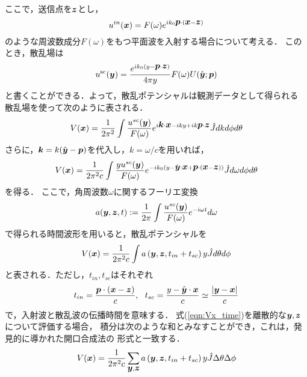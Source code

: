 ここで，送信点を$\mbox{\boldmath $z$}$とし，
\begin{equation}
	u^{in}(\mbox{\boldmath $x$})= F(\omega) e^{ik_0\mbox{\boldmath $p$}\cdot(\mbox{\boldmath $x$}-\mbox{\boldmath $z$})}
	\label{eqn:}
\end{equation}
のような周波数成分$F(\omega)$をもつ平面波を入射する場合について考える．
このとき，散乱場は
\begin{equation}
	u^{\rm sc}(\mbox{\boldmath $y$})= \frac{e^{ik_0(y-\mbox{\boldmath $p$}\cdot \mbox{\boldmath $z$})}}{4\pi y }F(\omega)U(\hat{\mbox{\boldmath $y$}};\mbox{\boldmath $p$}) 
	\label{eqn:}
\end{equation}
と書くことができる．よって，散乱ポテンシャルは観測データとして得られる
散乱場を使って次のように表される．
\begin{equation}
	V(\mbox{\boldmath $x$}) =\frac{1}{2\pi^2} \int \frac{u^{sc}(\mbox{\boldmath $y$})}{F(\omega)}
	e^{i\mbox{\boldmath $k$}\cdot \mbox{\boldmath $x$}-iky+ik\mbox{\boldmath $p$}\cdot\mbox{\boldmath $z$}}
	\hat{J} dkd\phi d\theta	
	\label{eqn:}
\end{equation}
さらに，$\mbox{\boldmath $k$}=k(\hat{\mbox{\boldmath $y$}}-\mbox{\boldmath $p$})$を代入し，$k=\omega/c$を用いれば，
\begin{equation}
	V(\mbox{\boldmath $x$}) =\frac{1}{2\pi^2c} \int \frac{yu^{sc}(\mbox{\boldmath $y$})}{F(\omega)}
	e^{-ik_0(y-\hat{\mbox{\boldmath $y$}}\cdot\mbox{\boldmath $x$}+\mbox{\boldmath $p$}\cdot(\mbox{\boldmath $x$}-\mbox{\boldmath $z$})) }
	\hat{J} d\omega d\phi d\theta	
	\label{eqn:}
\end{equation}
を得る．
ここで，角周波数$\omega$に関するフーリエ変換
\begin{equation}
	a(\mbox{\boldmath $y$},\mbox{\boldmath $z$},t):=\frac{1}{2\pi} \int \frac{u^{sc}(\mbox{\boldmath $y$})}{F(\omega)}e^{-i\omega t}d\omega
	\label{eqn:}
\end{equation}
で得られる時間波形を用いると，散乱ポテンシャルを
\begin{equation}
	V(\mbox{\boldmath $x$}) =\frac{1}{2\pi^2c} \int a\left(\mbox{\boldmath $y$}, \mbox{\boldmath $z$}, t_{in}+t_{sc} \right) y \hat{J} d\theta d\phi
	\label{eqn:Vx_time}
\end{equation}
と表される．ただし，$t_{in},t_{sc}$はそれぞれ
\begin{equation}
	t_{in}=\frac{\fat{p}\cdot \left( \fat{x}-\fat{z}\right)}{c}, \ \ 
	t_{sc}=
	\frac{ y-\hat{\fat{y}}\cdot \fat{x} }{c} \simeq 
	\frac{\left|\fat{y}-\fat{x}\right|}{c} 
	\label{eqn:}
\end{equation}
で，入射波と散乱波の伝播時間を意味する．
式(\ref{eqn:Vx_time})を離散的な$\mbox{\boldmath $y$},\mbox{\boldmath $z$}$について評価する場合，
積分は次のような和とみなすことができ，これは，発見的に導かれた開口合成法の
形式と一致する．
\begin{equation}
	V(\mbox{\boldmath $x$}) = 
	\frac{1}{2\pi^2c} 
	\sum_{\mbox{\boldmath $y$},\mbox{\boldmath $z$}} 
	a\left(\mbox{\boldmath $y$}, \mbox{\boldmath $z$}, t_{in}+t_{sc} \right) y \hat{J} \Delta \theta \Delta \phi
	\label{eqn:}
\end{equation}


